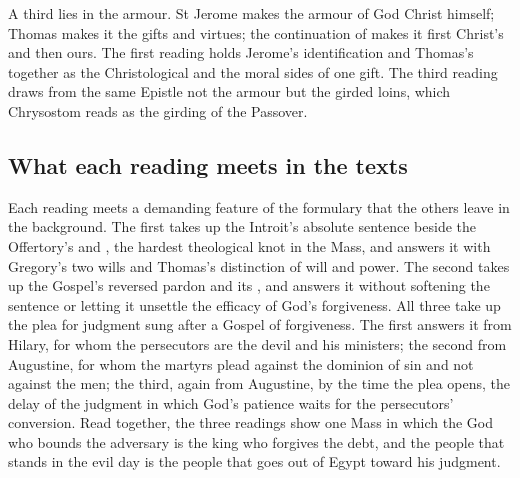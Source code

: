 A third lies in the armour. St Jerome makes the armour of God Christ himself;
Thomas makes it the gifts and virtues; the continuation of  makes it first Christ's and then ours. The first reading holds Jerome's
identification and Thomas's together as the Christological and the moral sides of
one gift. The third reading draws from the same Epistle not the armour but the
girded loins, which Chrysostom reads as the girding of the Passover.

\subsection{What each reading meets in the texts}

Each reading meets a demanding feature of the formulary that the others leave in
the background. The first takes up the Introit's absolute sentence beside the
Offertory's  and , the hardest
theological knot in the Mass, and answers it with Gregory's two wills and Thomas's
distinction of will and power. The second takes up the Gospel's reversed pardon
and its , and answers it without softening the sentence
or letting it unsettle the efficacy of God's forgiveness. All three take up the
plea for judgment sung after a Gospel of forgiveness. The first answers it from
Hilary, for whom the persecutors are the devil and his ministers; the second from
Augustine, for whom the martyrs plead against the dominion of sin and not against
the men; the third, again from Augustine, by the time the plea opens, the delay of
the judgment in which God's patience waits for the persecutors' conversion. Read together, the
three readings show one Mass in which the God who bounds the adversary is the king
who forgives the debt, and the people that stands in the evil day is the people
that goes out of Egypt toward his judgment.
